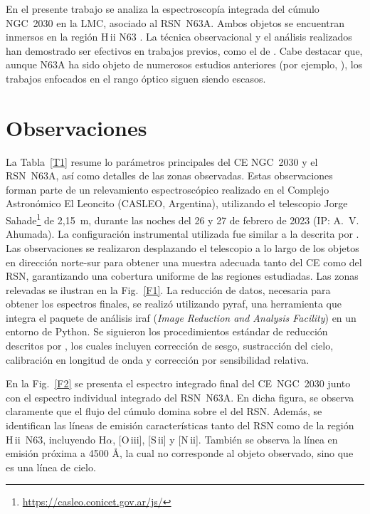 \documentclass[baaa]{baaa}
\begin{document}
En el presente trabajo se analiza la espectroscopía integrada del cúmulo NGC~2030 en la LMC, asociado al RSN~N63A. Ambos objetos se encuentran inmersos en la región H\,{\sc ii} N63 \citep{Laval+1986}. La técnica observacional y el análisis realizados han demostrado ser efectivos en trabajos previos, como el de \citet{Ahumada+2019}. Cabe destacar que, aunque N63A ha sido objeto de numerosos estudios anteriores (por ejemplo, \citealt{karagoz2023}), los trabajos enfocados en el rango óptico siguen siendo escasos.


\section{Observaciones}
La Tabla~\ref{T1} resume lo parámetros principales del CE NGC~2030 y el RSN~N63A, así como detalles de las zonas observadas. Estas observaciones forman parte de un relevamiento espectroscópico realizado en el Complejo Astronómico El Leoncito (CASLEO, Argentina), utilizando el telescopio Jorge Sahade\footnote{\url{https://casleo.conicet.gov.ar/js/}} de 2,15~m, durante las noches del 26 y 27 de febrero de 2023 (IP: A.~V. Ahumada). 
La configuración instrumental utilizada fue similar a la descrita por \citet{Rodriguez-Buss+2024}. Las observaciones se realizaron desplazando el telescopio a lo largo de los objetos en dirección norte-sur para obtener una muestra adecuada tanto del CE como del RSN, garantizando una cobertura uniforme de las regiones estudiadas. Las zonas relevadas se ilustran en la Fig.~\ref{F1}.
La reducción de datos, necesaria para obtener los espectros finales, se realizó utilizando {\sc pyraf}, una herramienta que integra el paquete de análisis {\sc iraf} (\textit{Image Reduction and Analysis Facility}) en un entorno de Python. Se siguieron los procedimientos estándar de reducción descritos por \citet{Tapia-Reina_2023}, los cuales incluyen corrección de sesgo, sustracción del cielo, calibración en longitud de onda y corrección por sensibilidad relativa.

En la Fig.~\ref{F2} se presenta el espectro integrado final del CE~NGC~2030 junto con el espectro individual integrado del RSN~N63A. En dicha figura, se observa claramente que el flujo del cúmulo domina sobre el del RSN. Además, se identifican las líneas de emisión características tanto del RSN como de la región H\,{\sc ii}~N63, incluyendo H$\alpha$, [O\,{\sc iii}], [S\,{\sc ii}] y [N\,{\sc ii}]. También se observa la línea en emisión próxima a 4500 \AA, la cual no corresponde al objeto observado, sino que es una línea de cielo.
\end{document}
